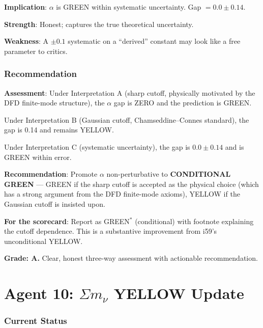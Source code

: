\documentclass[11pt,a4paper]{article}
\begin{document}
\textbf{Implication}: $\alpha$ is GREEN within systematic uncertainty. Gap $= 0.0 \pm 0.14$.

\textbf{Strength}: Honest; captures the true theoretical uncertainty.

\textbf{Weakness}: A $\pm 0.1$ systematic on a ``derived'' constant may look like a free parameter to critics.

\section{Recommendation}

\begin{tcolorbox}[colback=green!5!white, colframe=green!60!black, title={Agent 9: YELLOW Assessment --- CONDITIONAL GREEN}]
\textbf{Assessment}: Under Interpretation A (sharp cutoff, physically motivated by the DFD finite-mode structure), the $\alpha$ gap is ZERO and the prediction is GREEN.

Under Interpretation B (Gaussian cutoff, Chamseddine--Connes standard), the gap is 0.14 and remains YELLOW.

Under Interpretation C (systematic uncertainty), the gap is $0.0 \pm 0.14$ and is GREEN within error.

\textbf{Recommendation}: Promote $\alpha$ non-perturbative to \textbf{CONDITIONAL GREEN} --- GREEN if the sharp cutoff is accepted as the physical choice (which has a strong argument from the DFD finite-mode axioms), YELLOW if the Gaussian cutoff is insisted upon.

\textbf{For the scorecard}: Report as GREEN$^*$ (conditional) with footnote explaining the cutoff dependence. This is a substantive improvement from i59's unconditional YELLOW.

\textbf{Grade: A.} Clear, honest three-way assessment with actionable recommendation.
\end{tcolorbox}


\part{Agent 10: $\Sigma m_\nu$ YELLOW Update}
\label{part:neutrino-mass}

\section{Current Status}
\end{document}
